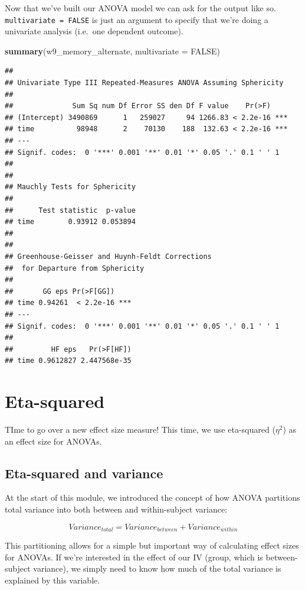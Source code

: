\documentclass[
]{book}
\newenvironment{Shaded}{\begin{snugshade}}{\end{snugshade}}
\newcommand{\AttributeTok}[1]{\textcolor[rgb]{0.13,0.29,0.53}{#1}}
\newcommand{\ConstantTok}[1]{\textcolor[rgb]{0.56,0.35,0.01}{#1}}
\newcommand{\FunctionTok}[1]{\textcolor[rgb]{0.13,0.29,0.53}{\textbf{#1}}}
\newcommand{\NormalTok}[1]{#1}
\begin{document}
Now that we've built our ANOVA model we can ask for the output like so. \texttt{multivariate\ =\ FALSE} is just an argument to specify that we're doing a univariate analysis (i.e.~one dependent outcome).

\begin{Shaded}
\begin{Highlighting}[]
\FunctionTok{summary}\NormalTok{(w9\_memory\_alternate, }\AttributeTok{multivariate =} \ConstantTok{FALSE}\NormalTok{)}
\end{Highlighting}
\end{Shaded}

\begin{verbatim}
## 
## Univariate Type III Repeated-Measures ANOVA Assuming Sphericity
## 
##              Sum Sq num Df Error SS den Df F value    Pr(>F)    
## (Intercept) 3490869      1   259027     94 1266.83 < 2.2e-16 ***
## time          98948      2    70130    188  132.63 < 2.2e-16 ***
## ---
## Signif. codes:  0 '***' 0.001 '**' 0.01 '*' 0.05 '.' 0.1 ' ' 1
## 
## 
## Mauchly Tests for Sphericity
## 
##      Test statistic  p-value
## time        0.93912 0.053894
## 
## 
## Greenhouse-Geisser and Huynh-Feldt Corrections
##  for Departure from Sphericity
## 
##       GG eps Pr(>F[GG])    
## time 0.94261  < 2.2e-16 ***
## ---
## Signif. codes:  0 '***' 0.001 '**' 0.01 '*' 0.05 '.' 0.1 ' ' 1
## 
##         HF eps   Pr(>F[HF])
## time 0.9612827 2.447568e-35
\end{verbatim}

\section{Eta-squared}\label{eta-squared}

TIme to go over a new effect size measure! This time, we use eta-squared (\(\eta^2\)) as an effect size for ANOVAs.

\subsection{Eta-squared and variance}\label{eta-squared-and-variance}

At the start of this module, we introduced the concept of how ANOVA partitions total variance into both between and within-subject variance:

\[
Variance_{total} = Variance_{between} + Variance_{within}
\]

This partitioning allows for a simple but important way of calculating effect sizes for ANOVAs. If we're interested in the effect of our IV (group, which is between-subject variance), we simply need to know how much of the total variance is explained by this variable.
\end{document}
